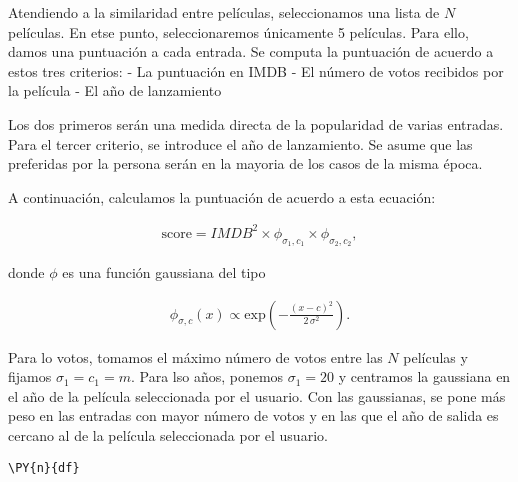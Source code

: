 Atendiendo a la similaridad entre películas, seleccionamos una lista de
\(N\) películas. En etse punto, seleccionaremos únicamente 5 películas.
Para ello, damos una puntuación a cada entrada. Se computa la puntuación
de acuerdo a estos tres criterios: - La puntuación en IMDB - El número
de votos recibidos por la película - El año de lanzamiento

Los dos primeros serán una medida directa de la popularidad de varias
entradas. Para el tercer criterio, se introduce el año de lanzamiento.
Se asume que las preferidas por la persona serán en la mayoria de los
casos de la misma época.

A continuación, calculamos la puntuación de acuerdo a esta ecuación:

    \begin{eqnarray}
\mathrm{score} = IMDB^2 \times \phi_{\sigma_1, c_1} \times  \phi_{\sigma_2, c_2},
\end{eqnarray}

donde \(\phi\) es una función gaussiana del tipo

\begin{eqnarray}
\phi_{\sigma, c}(x) \propto \mathrm{exp}\left(-\frac{(x-c)^2}{2 \, \sigma^2}\right).
\end{eqnarray}

    Para lo votos, tomamos el máximo número de votos entre las \(N\)
películas y fijamos \(\sigma_1 = c_1 = m\). Para lso años, ponemos
\(\sigma_1 = 20\) y centramos la gaussiana en el año de la película
seleccionada por el usuario. Con las gaussianas, se pone más peso en las
entradas con mayor número de votos y en las que el año de salida es
cercano al de la película seleccionada por el usuario.

    \begin{tcolorbox}[breakable, size=fbox, boxrule=1pt, pad at break*=1mm,colback=cellbackground, colframe=cellborder]
\begin{Verbatim}[commandchars=\\\{\}]
\PY{n}{df}
\end{Verbatim}
\end{tcolorbox}

